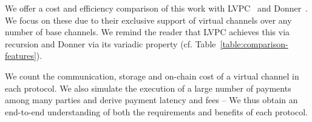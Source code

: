 
  We offer a cost and efficiency comparison of this work with
  LVPC~\cite{10.1007/978-3-030-65411-5_18} and Donner~\cite{donner}. We focus on
  these due to their exclusive support of
  virtual channels over any number of base channels. We remind the reader that LVPC
  achieves this via recursion and Donner via
  its variadic property (cf. Table~\ref{table:comparison-features}).

  We count the communication, storage and on-chain cost of a virtual
  channel in each protocol. We also simulate the execution of a large number
  of payments among many parties and derive payment latency and fees --
  We thus
  obtain an end-to-end understanding of both the requirements and benefits
  of each protocol.

